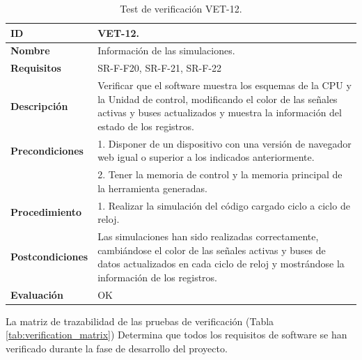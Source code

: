 \begin{center}
\begin{table}[htb]
\centering
\begin{tabular}{@{}p{2.5cm} p{13cm}@{}} 
\toprule
\textbf{ID} 					& VET-12. \\
\midrule
\textbf{Nombre} 				& Información de las simulaciones. \\
\midrule
\textbf{Requisitos} 		& SR-F-F20, SR-F-21, SR-F-22\\
\midrule
\textbf{Descripción} 		& Verificar que el software muestra los esquemas de la CPU y la Unidad de control, modificando el color de las señales activas y buses actualizados y muestra la información del estado de los registros. \\
\midrule
\textbf{Precondiciones}		& 1. Disponer de un dispositivo con una versión de navegador web igual o superior a los indicados anteriormente. \\
											& 2. Tener la memoria de control y la memoria principal de la herramienta generadas. \\
\midrule
\textbf{Procedimiento}		& 1. Realizar la simulación del código cargado ciclo a ciclo de reloj.\\
\midrule
\textbf{Postcondiciones} 		&  Las simulaciones han sido realizadas correctamente, cambiándose el color de las señales activas y buses de datos actualizados en cada ciclo de reloj y mostrándose la información de los registros.\\
\midrule
\textbf{Evaluación} 			& OK \\
\bottomrule
\end{tabular}
\caption{Test de verificación VET-12.}
\label{tab:vet12}
\end{table}
\end{center}

\clearpage



La matriz de trazabilidad de las pruebas de verificación (Tabla \ref{tab:verification_matrix}) Determina que todos los requisitos de software se han verificado durante la fase de desarrollo del proyecto.

\vspace{2cm}



